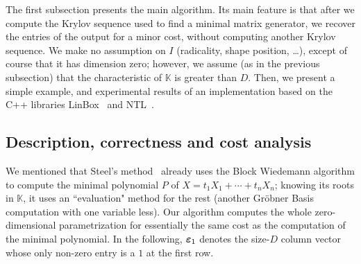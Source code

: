 \documentclass[12pt]{article}
\newcommand{\col}[1]{\bm{\MakeLowercase{#1}}} %
\newcommand{\minpoly}{P}
\newcommand{\lf}{X}
\def\K{\mathbb{K}}
\def\K {\ensuremath{\mathbb{K}}}
\begin{document}
The first subsection presents the main algorithm. Its main feature is
that after we compute the Krylov sequence used to find a minimal
matrix generator, we recover the entries of the output for a minor
cost, without computing another Krylov sequence. We make no assumption
on $I$ (radicality, shape position, \dots), except of course that it
has dimension zero; however, we assume (as in the previous subsection)
that the characteristic of $\K$ is greater than $D$. Then, we present a 
simple example, and experimental results of an implementation based on 
the C++ libraries LinBox~\cite{LinBox} and NTL~\cite{NTL}.


\subsection{Description, correctness and cost analysis}\label{ssec:mainalgo}

We mentioned that Steel's method~\cite{Steel15} already uses the Block
Wiedemann algorithm to compute the minimal polynomial $\minpoly$ of
$\lf=t_1 X_1 + \cdots + t_n X_n$; knowing its roots in $\K$, it uses
an ``evaluation" method for the rest (another Gr\"obner Basis
computation with one variable less).  Our algorithm computes the whole
zero-dimensional parametrization for essentially the same cost as the
computation of the minimal polynomial. In the following,
$\col{\varepsilon}_1$ denotes the size-$D$ column vector whose only
non-zero entry is a $1$ at the first row.
\end{document}
